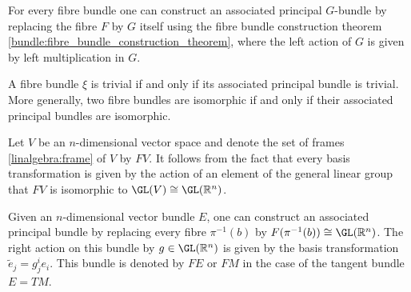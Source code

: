     \begin{construct}\label{bundle:associated_bundle_construction}
        For every fibre bundle one can construct an associated principal $G$-bundle by replacing the fibre $F$ by $G$ itself using the fibre bundle construction theorem \ref{bundle:fibre_bundle_construction_theorem}, where the left action of $G$ is given by left multiplication in $G$.
    \end{construct}

    \begin{property}
        A fibre bundle $\xi$ is trivial if and only if its associated principal bundle is trivial. More generally, two fibre bundles are isomorphic if and only if their associated principal bundles are isomorphic.
    \end{property}

    \begin{example}\label{bundle:frame_bundle}
        Let $V$ be an $n$-dimensional vector space and denote the set of frames \ref{linalgebra:frame} of $V$ by $FV$. It follows from the fact that every basis transformation is given by the action of an element of the general linear group that $FV$ is isomorphic to $\GL(V)\cong\GL(\mathbb{R}^n)$.

        Given an $n$-dimensional vector bundle $E$, one can construct an associated principal bundle by replacing every fibre $\pi^{-1}(b)$ by $F(\pi^{-1}(b))\cong\GL(\mathbb{R}^n)$. The right action on this bundle by $g\in\GL(\mathbb{R}^n)$ is given by the basis transformation $\widetilde{e}_j = g^i_je_i$. This bundle is denoted by $FE$ or $FM$ in the case of the tangent bundle $E=TM$.
    \end{example}

